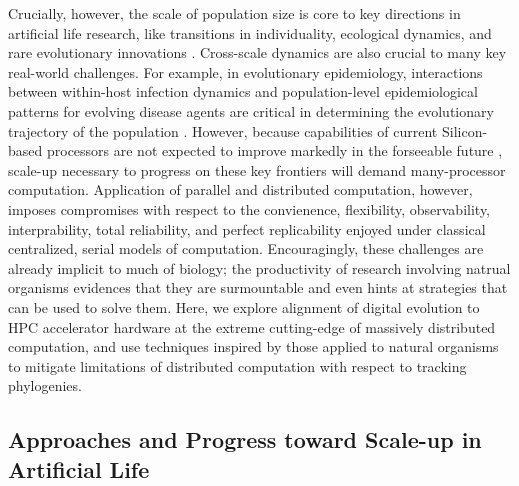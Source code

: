 Crucially, however, the scale of population size is core to key directions in artificial life research, like transitions in individuality, ecological dynamics, and rare evolutionary innovations \citep{CITETODO}.
Cross-scale dynamics are also crucial to many key real-world challenges.
For example, in evolutionary epidemiology, interactions between within-host infection dynamics and population-level epidemiological patterns for evolving disease agents are critical in determining the evolutionary trajectory of the population \citep{TODOCITE}.
However, because capabilities of current Silicon-based processors are not expected to improve markedly in the forseeable future \citep{sutter2005free}, scale-up necessary to progress on these key frontiers will demand many-processor computation.
Application of parallel and distributed computation, however, imposes compromises with respect to the convienence, flexibility, observability, interprability, total reliability, and perfect replicability enjoyed under classical centralized, serial models of computation.
Encouragingly, these challenges are already implicit to much of biology; the productivity of research involving natrual organisms evidences that they are surmountable and even hints at strategies that can be used to solve them.
Here, we explore alignment of digital evolution to HPC accelerator hardware at the extreme cutting-edge of massively distributed computation, and use techniques inspired by those applied to natural organisms to mitigate limitations of distributed computation with respect to tracking phylogenies.

\subsection{Approaches and Progress toward Scale-up in Artificial Life}

